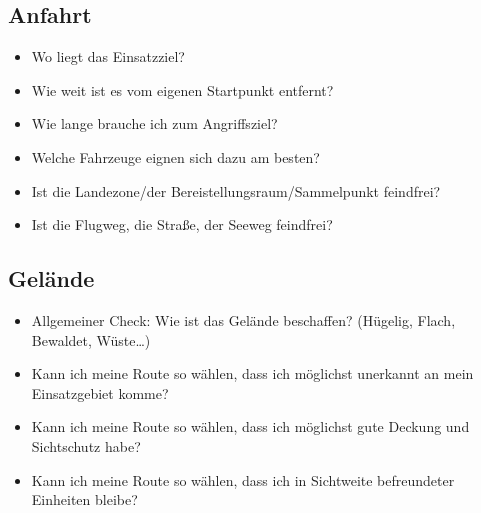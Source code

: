 \subsection{Anfahrt}
	\begin{itemize}
		\item Wo liegt das Einsatzziel?
		\item Wie weit ist es vom eigenen Startpunkt entfernt?
		\item Wie lange brauche ich zum Angriffsziel?
		\item Welche Fahrzeuge eignen sich dazu am besten?
		\item Ist die Landezone/der Bereistellungsraum/Sammelpunkt feindfrei?
		\item Ist die Flugweg, die Straße, der Seeweg feindfrei?
	\end{itemize}

\subsection{Gelände}
	\begin{itemize}
		\item Allgemeiner Check: Wie ist das Gelände beschaffen? (Hügelig, Flach, Bewaldet, Wüste…)
		\item Kann ich meine Route so wählen, dass ich möglichst unerkannt an mein Einsatzgebiet komme?
		\item Kann ich meine Route so wählen, dass ich möglichst gute Deckung und Sichtschutz habe?
		\item Kann ich meine Route so wählen, dass ich in Sichtweite befreundeter Einheiten bleibe?
	\end{itemize}

